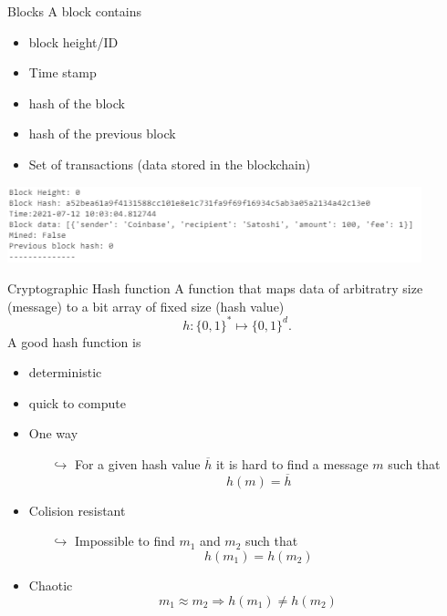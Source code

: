 \documentclass{beamer}
\begin{document}
\begin{frame}{Blocks}
A block contains
\begin{itemize}
  \item block height/ID
  \item Time stamp
  \item hash of the block
  \item hash of the previous block
  \item Set of transactions (data stored in the blockchain)
\end{itemize}
\begin{center}
\includegraphics[width=0.9\textwidth]{../../Figures/genesis_block.png}
\end{center}
\end{frame}
\begin{frame}{Cryptographic Hash function}
\small
A function that maps data of arbitratry size (message) to a bit array of fixed size (hash value)
$$
h:\{0,1\}^\ast\mapsto \{0,1\}^d. 
$$
A good hash function is
\begin{itemize}
\item deterministic
\item quick to compute
\item One way
\begin{itemize}
  \scriptsize
\item[$\hookrightarrow$] For a given hash value $\overline{h}$ it is hard to find a message $m$ such that 
$$
h(m) = \overline{h}
$$
\end{itemize}
\item Colision resistant 
\begin{itemize}
\item[$\hookrightarrow$] Impossible to find $m_1$ and $m_2$ such that 
$$
h(m_1) = h(m_2)
$$
\end{itemize}
\item Chaotic
$$m_1\approx m_2\Rightarrow  h(m_1) \neq h(m_2)$$
\end{itemize}

\end{frame}
\end{document}
